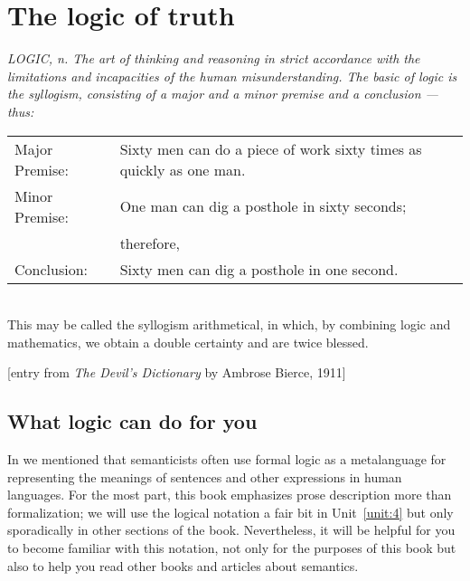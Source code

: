 \chapter{The logic of truth}\label{sec:4}
\begin{flushright} 
\parbox{.7\textwidth}{
\footnotesize\itshape 
 LOGIC, n.  The art of thinking and reasoning in strict accordance with the limitations and incapacities of the human misunderstanding. The basic of logic is the syllogism, consisting of a major and a minor premise and a conclusion — thus:\\

\begin{tabular}{l p{6cm}}
Major Premise: & Sixty men can do a piece of work sixty times as quickly as one man.\\

Minor Premise: & One man can dig a posthole in sixty seconds;\\
& therefore,\\

Conclusion: & Sixty men can dig a posthole in one second.\\
\end{tabular} \\

\noindent
This may be called the syllogism arithmetical, in which, by combining logic and mathematics, we obtain a double certainty and are twice blessed.

{\hfill} \textnormal{[entry from \textit{The Devil’s Dictionary} by Ambrose Bierce, 1911]}\\ 
}
\end{flushright}


\section{What logic can do for you}\label{sec:4.1}

In  we mentioned that semanticists often use formal logic as a metalanguage for representing the meanings of sentences and other expressions in human languages. For the most part, this book emphasizes prose description more than formalization; we will use the logical notation a fair bit in Unit~\ref{unit:4} but only sporadically in other sections of the book. Nevertheless, it will be helpful for you to become familiar with this notation, not only for the purposes of this book but also to help you read other books and articles about semantics.



